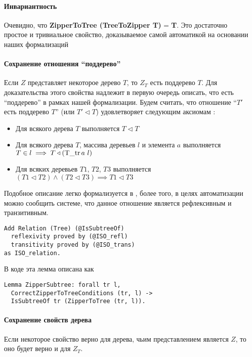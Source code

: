 \paragraph{Инвариантность}
Очевидно, что \textbf{ZipperToTree (TreeToZipper T)} = \textbf{T}. Это достаточно простое и тривиальное свойство, доказываемое самой автоматикой \tcoq на основании наших формализаций

\paragraph{Сохранение отношения ``поддерево''}
Если $Z$ представляет некоторое дерево $T$, то $Z_T$ есть поддерево $T$. Для доказательства этого свойства надлежит в первую очередь описать, что есть ``поддерево'' в рамках нашей формализации. Будем считать, что отношение ``$T'$ есть поддерево $T$'' (или $T' \triangleleft T$) удовлетворяет следующим аксиомам \autocite{Okasaki1996} \autocite{Cormen2002}:
\begin{itemize}
\item Для всякого дерева $T$ выполняется $T \triangleleft T$
\item Для всякого дерева $T$, массива деревьев $l$ и элемента $a$ выполняется $T \in l \implies T \triangleleft (\operatorname{T\_tr} a \ l)$
\item Для всяких деревьев $T1$, $T2$, $T3$ выполняется $(T1 \triangleleft T2) \wedge (T2 \triangleleft T3) \implies T1 \triangleleft T3$
\end{itemize}

Подобное описание легко формализуется в \tcoq, более того, в целях автоматизации можно сообщить системе, что данное отношение является рефлексивным и транзитивным.

\begin{lstlisting}
Add Relation (Tree) (@IsSubtreeOf)
  reflexivity proved by (@ISO_refl)
  transitivity proved by (@ISO_trans)
as ISO_relation.
\end{lstlisting}

В коде эта лемма описана как
\begin{lstlisting}
Lemma ZipperSubtree: forall tr l,
  CorrectZipperToTreeConditions (tr, l) ->
  IsSubtreeOf tr (ZipperToTree (tr, l)).
\end{lstlisting}

\paragraph{Сохранение свойств дерева}
Если некоторое свойство верно для дерева, чьим представлением является $Z$, то оно будет верно и для $Z_T$. 

